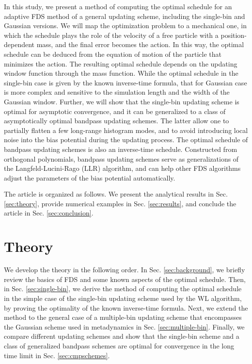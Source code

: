 \documentclass[preprint, superscriptaddress, floatfix]{revtex4-1}
\begin{document}
In this study,
we present a method of computing
the optimal schedule
for an adaptive FDS method
of a general updating scheme,
including the single-bin and Gaussian versions.
%
We will map the optimization problem to a mechanical one,
in which the schedule plays the role of the velocity of
a free particle with a position-dependent mass,
and the final error becomes the action.
%
In this way, the optimal schedule
can be deduced from the equation of motion
of the particle that minimizes the action.
%
The resulting optimal schedule
depends on the updating window function
through the mass function.
%
While the optimal schedule in the single-bin case
is given by the known inverse-time formula,
that for Gaussian case is more complex
and sensitive to the simulation length
and the width of the Gaussian window.
%
%
Further, we will show that
the single-bin updating scheme
is optimal for asymptotic convergence,
and it can be generalized
to a class of asymptotically optimal
bandpass updating schemes.
%
The latter allow one to partially flatten
a few long-range histogram modes,
and to avoid introducing local noise
into the bias potential during the updating process.
%
The optimal schedule of bandpass updating schemes
is also an inverse-time schedule.
%
Constructed from orthogonal polynomials,
bandpass updating schemes serve as
generalizations of the Langfeld-Lucini-Rago (LLR)
algorithm\cite{langfeld2012, pellegrini2014},
and can help other FDS
algorithms\cite{neuhaus2006, *neuhaus2007, zhu2012}
adjust the parameters of the bias potential automatically.

The article is organized as follows.
%
We present the analytical results in Sec. \ref{sec:theory},
provide numerical examples
in Sec. \ref{sec:results},
and conclude the article
in Sec. \ref{sec:conclusion}.




\section{\label{sec:theory}
Theory}



We develop the theory
in the following order.
%
In Sec. \ref{sec:background},
we briefly review the basics of FDS
and some known aspects of the optimal schedule.
%
Then, in Sec. \ref{sec:single-bin},
we derive the method of
computing the optimal schedule
in the simple case of the
single-bin updating scheme
used by the WL algorithm,
by proving the optimality
of the known inverse-time formula.
%
Next, we extend the method to the general case
of a multiple-bin updating scheme
that encompasses the Gaussian scheme used in metadynamics
in Sec. \ref{sec:multiple-bin}.
%
Finally, we compare different updating schemes
and show that the single-bin scheme
and a class of generalized bandpass schemes
are optimal for convergence
in the long time limit
in Sec. \ref{sec:cmpschemes}.
\end{document}
